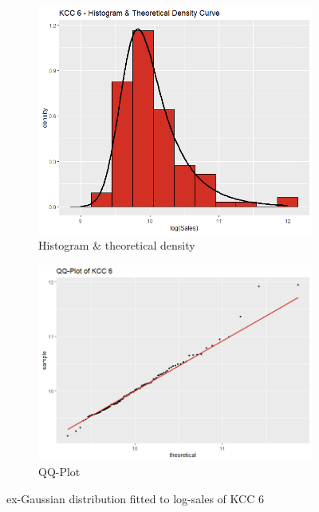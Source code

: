  \begin{figure}[H]
\centering
\begin{subfigure}{.45\textwidth}
  \centering
  \includegraphics[width=\linewidth]{figures/kcc_6_density.png}
  \caption{Histogram \& theoretical density}
  \label{fig:kcc_6_density}
\end{subfigure}
\begin{subfigure}{.45\textwidth}
  \centering
  \includegraphics[width=\linewidth]{figures/kcc_6_qqplot.png}
  \caption{QQ-Plot}
  \label{fig:kcc_6_qqplot}
\end{subfigure}
\caption{ex-Gaussian distribution fitted to log-sales of \ac{KCC} 6}
\label{fig:kcc_6_margin}
\end{figure} 


